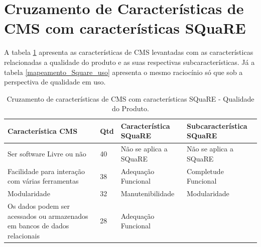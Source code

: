 \begin{apendicesenv}
\begin{landscape}
\begin{longtable}{|p{10pt}|p{220pt}|p{430pt}|}
\end{longtable}
	
\end{landscape}

\section{Cruzamento de Características de CMS com características SQuaRE}
\label{Cruzamento_Apendice}
A tabela \ref{mapeamento_Square} apresenta as características de CMS levantadas com as características relacionadas a qualidade do produto e as suas respectivas subcaracterísticas. Já a tabela \ref{mapeamento_Square_uso} apresenta o mesmo raciocínio só que sob a perspectiva de qualidade em uso.

	\begin{longtable}{|p{175pt}|p{18pt}|p{110pt}|p{120pt}|}
 	\caption{Cruzamento de características de CMS com características SQuaRE - Qualidade do Produto.} 
 	\label{mapeamento_Square}\\
 	\hline
 	 {\raggedright \textbf{Característica CMS}}
 	 & {\raggedright \textbf{Qtd}}
 	 & {\raggedright \textbf{Característica SQuaRE}}
 	  	 & {\raggedright \textbf{Subcaracterística SQuaRE}}\\
 	\hline
 	{\raggedright {Ser software Livre ou não}}
 	 	 & {\raggedright {40}}
 	 	 & {\raggedright {Não se aplica a SQuaRE}}
 	 	  	 	 & {\raggedright Não se aplica a SQuaRE}\\
 	 	\hline
 	{\raggedright {Facilidade para interação com várias ferramentas}}
 	 	 & {\raggedright {38}}
 	 	 & {\raggedright {Adequação Funcional}}
 	 	 & {\raggedright {Completude Funcional}}\\
 	 	\hline
{\raggedright {Modularidade}}
 	 	 & {\raggedright {32}}
 	 	 & {\raggedright {Manutenibilidade}}
 	 	 & {\raggedright {Modularidade}}\\
 	 	\hline
 {\raggedright {Os dados podem ser acessados ou armazenados em bancos de dados relacionais}}
  	 	 & {\raggedright {28}}
  	 	 & {\raggedright {Adequação Funcional}}

\end{longtable}
\end{apendicesenv}
